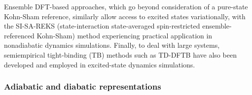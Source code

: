 \documentclass[9pt,bestpractices]{livecoms}
\newcommand\bfec[1]{\textcolor{blue}{\textit{ XXX BFEC: #1 XXX }}}
\begin{document}
Ensemble DFT-based approaches, which go beyond consideration of a pure-state Kohn-Sham reference,\cite{lieb_density_1983,gross_density-functional_1988} similarly allow access to excited states variationally, with the SI-SA-REKS (state-interaction state-averaged spin-restricted ensemble-referenced Kohn-Sham) method\cite{filatov1999spin,filatov_spin-restricted_2015} experiencing practical application in nonadiabatic dynamics simulations.\cite{filatov2019theoretical,filatov2019non,janos2023controls}
Finally, to deal with large systems, semiempirical tight-binding (TB) methods such as TD-DFTB have also been developed\cite{niehaus2001tight} and employed in excited-state dynamics simulations.\cite{mitric2009nonadiabatic,humeniuk2017dftbaby}




\subsubsection{Adiabatic and diabatic representations}
\label{sec_adiabatic_diabatic}
\end{document}
